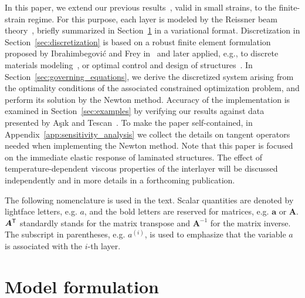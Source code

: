 \documentclass[11pt]{article}
\newcommand{\rev}[1]{#1}
\newcommand{\Aref}[1]{Appendix~\ref{#1}}
\newcommand{\M}[1]{{\boldsymbol #1}}
\newcommand{\lay}[1]{^{(#1)}}
\newcommand{\trn}{{\sf ^T}}        \newcommand{\eL}[2]{L_{#1}\lay{#2}}
\newcommand{\Sref}[1]{Section~\ref{#1}}
\begin{document}
In this paper, we extend our previous
results~\cite{Zemanova:2008:SNM}, valid in small strains, to the finite-strain
regime. For this purpose, each layer is modeled by the Reissner beam
theory~\cite{Reissner:1972:ODFSBT}, briefly summarized in \Sref{sec:formulation}
in a variational format. Discretization in \Sref{sec:discretization} is
based on a robust finite element formulation proposed by Ibrahimbegovi\'{c} and
Frey in~\cite{Ibrahimbegovic:1993:FEA} and later applied, e.g., to discrete
materials modeling~\cite{Ibrahimbegovic:2003:MMD}, or optimal control and design
of structures~\cite{Ibrahimbegovic:2004}. In \Sref{sec:governing_equations}, we
derive the discretized system arising from the optimality conditions of the
associated constrained optimization problem, and perform its solution by the
Newton method. Accuracy of the implementation is examined in \Sref{sec:examples}
by verifying our results against data presented by A\c{s}\i{}k and
Tescan~\cite{Asik:2005:MMB}. To make the paper self-contained, in
\Aref{app:sensitivity_analysis} we collect the details on tangent operators
needed when implementing the Newton method. Note that this paper is focused on
the immediate elastic response of laminated structures. The effect of
\rev{temperature}-dependent viscous properties of the interlayer will be
discussed independently and in more details in a forthcoming publication.

The following nomenclature is used in the text. Scalar quantities are denoted by
lightface letters, e.g. $a$, and the bold letters are reserved for matrices,
e.g. $\M{a}$ or $\M{A}$. $\M{A}\trn$ standardly stands for the matrix transpose
and $\M{A}^{-1}$ for the matrix inverse. The subscript in parentheses, e.g.
$a\lay{i}$, is used to emphasize that the variable $a$ is associated with the
$i$-th layer.

\section{Model formulation}\label{sec:formulation}
\end{document}
